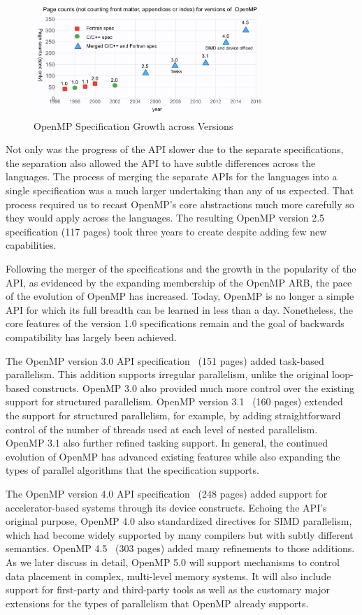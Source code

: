 \begin{figure}
  \centering
  \includegraphics[width=3.4in]{pics/opcounts-marked.png}
  \caption{OpenMP Specification Growth across Versions\label{omppcount}}
\end{figure}

Not only was the progress of the API slower due to the separate 
specifications, the separation also allowed the API to have subtle 
differences across the languages. The process of merging the separate
APIs for the languages into a single  specification was a much larger 
undertaking than any of us expected. That process required us to recast 
OpenMP's core abstractions much more carefully so they would apply across 
the languages. The resulting OpenMP version 2.5 specification (117 pages)
took three years to create despite adding few new capabilities.

Following the merger of the specifications and the growth in the popularity
of the API, as evidenced by the expanding membership of the OpenMP ARB,
the pace of the evolution of OpenMP has increased. Today, OpenMP is no 
longer a simple API for which its full breadth can be learned in less 
than a day. Nonetheless, the core features of the version 1.0 specifications
remain and the goal of backwards compatibility has largely been achieved.

The OpenMP version 3.0 API specification~\cite{openmp3} (151 pages) added
task-based parallelism. This addition supports irregular parallelism, unlike 
the original loop-based constructs. OpenMP 3.0 also provided much more control
over the existing support for structured parallelism. OpenMP 
version 3.1~\cite{openmp31} (160 pages) extended the support for structured 
parallelism, for example, by adding straightforward control of the number of 
threads used at each level of nested parallelism. OpenMP 3.1 also further 
refined tasking support. In general, the continued evolution of OpenMP has 
advanced existing features while also expanding the types of parallel 
algorithms that the specification supports.

The OpenMP version 4.0 API specification~\cite{openmp4} (248 pages) added 
support for accelerator-based systems through its device constructs. Echoing 
the API's original purpose, OpenMP 4.0 also standardized directives for SIMD 
parallelism, which had become widely supported by many compilers but with 
subtly different semantics. OpenMP 4.5~\cite{openmp45} (303 pages) added many 
refinements to those additions. As we later discuss in detail, OpenMP 5.0 will
support mechanisms to control data placement in complex, multi-level memory 
systems. It will also include support for first-party and third-party tools 
as well as the customary major extensions for the types of parallelism that
OpenMP already supports.

